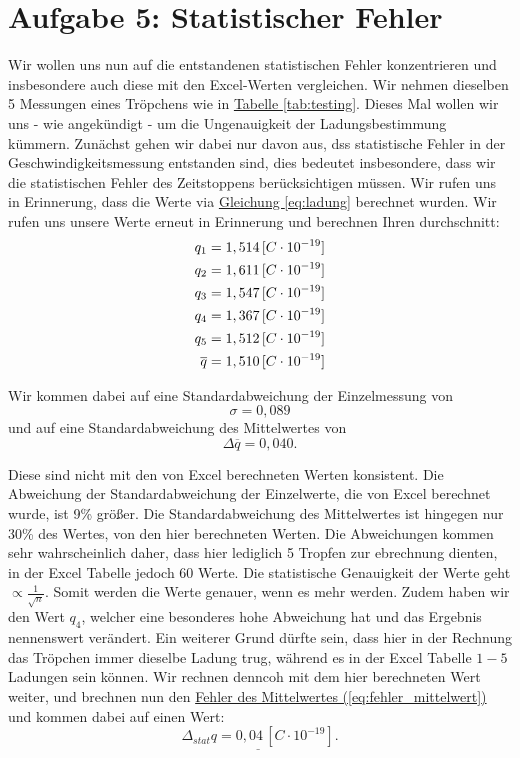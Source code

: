 \section{Aufgabe 5: Statistischer Fehler}
Wir wollen uns nun auf die entstandenen statistischen Fehler konzentrieren und insbesondere auch diese mit den Excel-Werten vergleichen.
Wir nehmen dieselben 5 Messungen eines Tröpchens wie in \hyperref[tab:testing]{Tabelle \ref*{tab:testing}}. Dieses Mal wollen wir uns - wie angekündigt - um die Ungenauigkeit der Ladungsbestimmung kümmern.
Zunächst gehen wir dabei nur davon aus, dss statistische Fehler in der Geschwindigkeitsmessung entstanden sind, dies bedeutet insbesondere, dass wir die statistischen Fehler des Zeitstoppens berücksichtigen müssen.
Wir rufen uns in Erinnerung, dass die Werte via \hyperref[eq:ladung]{Gleichung \ref*{eq:ladung}} berechnet wurden. Wir rufen uns unsere Werte erneut in Erinnerung und berechnen Ihren durchschnitt:
\begin{align}
    q_1 = 1,514 \, [C \cdot 10^{-19}] \notag \\
    q_2 = 1,611 \, [C \cdot 10^{-19}] \notag \\
    q_3 = 1,547 \, [C \cdot 10^{-19}] \notag \\
    q_4 = 1,367 \, [C \cdot 10^{-19}] \notag \\
    q_5 = 1,512 \, [C \cdot 10^{-19}] \notag \\
    \overline{q} = 1,510 \, [C \cdot 10^{-19}]
\end{align}

Wir kommen dabei auf eine Standardabweichung der Einzelmessung von
\begin{equation}
    \sigma = 0,089 
\end{equation}
und auf eine Standardabweichung des Mittelwertes von
\begin{equation}
    \Delta \overline{q} = 0,040.
\end{equation}

Diese sind nicht mit den von Excel berechneten Werten konsistent. Die Abweichung der Standardabweichung der Einzelwerte, die von Excel berechnet wurde, ist 9\% größer.
Die Standardabweichung des Mittelwertes ist hingegen nur 30\% des Wertes, von den hier berechneten Werten. Die Abweichungen kommen sehr wahrscheinlich daher, dass hier lediglich 5 Tropfen zur ebrechnung dienten, 
in der Excel Tabelle jedoch 60 Werte. Die statistische Genauigkeit der Werte geht $\propto \frac{1}{\sqrt{n}}$. Somit werden die Werte genauer, wenn es mehr werden.
Zudem haben wir den Wert $q_4$, welcher eine besonderes hohe Abweichung hat und das Ergebnis nennenswert verändert. 
Ein weiterer Grund dürfte sein, dass hier in der Rechnung das Tröpchen immer dieselbe Ladung trug, während es in der Excel Tabelle $1-5$ Ladungen sein können. 
Wir rechnen denncoh mit dem hier berechneten Wert weiter,
und brechnen nun den \hyperref[eq:fehler_mittelwert]{Fehler des Mittelwertes (\ref*{eq:fehler_mittelwert})} und kommen dabei auf einen Wert:
\begin{equation}
    \underline{\Delta_{stat} q = 0,04 \, [C \cdot 10^{-19}]}.
\end{equation}


